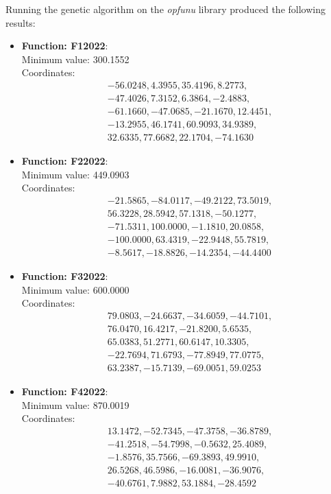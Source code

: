 \documentclass{article}
\begin{document}
Running the genetic algorithm on the \textit{opfunu} library
produced the following results:

\begin{itemize}
  \item \textbf{Function: F12022}: \\
    Minimum value: 300.1552 \\
    Coordinates:
    \[
      \begin{aligned}
        & -56.0248, 4.3955, 35.4196, 8.2773, \\
        & -47.4026, 7.3152, 6.3864, -2.4883, \\
        & -61.1660, -47.0685, -21.1670, 12.4451, \\
        & -13.2955, 46.1741, 60.9093, 34.9389, \\
        & 32.6335, 77.6682, 22.1704, -74.1630
      \end{aligned}
    \]

  \item \textbf{Function: F22022}: \\
    Minimum value: 449.0903 \\
    Coordinates:
    \[
      \begin{aligned}
        & -21.5865, -84.0117, -49.2122, 73.5019, \\
        & 56.3228, 28.5942, 57.1318, -50.1277, \\
        & -71.5311, 100.0000, -1.1810, 20.0858, \\
        & -100.0000, 63.4319, -22.9448, 55.7819, \\
        & -8.5617, -18.8826, -14.2354, -44.4400
      \end{aligned}
    \]

  \item \textbf{Function: F32022}: \\
    Minimum value: 600.0000 \\
    Coordinates:
    \[
      \begin{aligned}
        & 79.0803, -24.6637, -34.6059, -44.7101, \\
        & 76.0470, 16.4217, -21.8200, 5.6535, \\
        & 65.0383, 51.2771, 60.6147, 10.3305, \\
        & -22.7694, 71.6793, -77.8949, 77.0775, \\
        & 63.2387, -15.7139, -69.0051, 59.0253
      \end{aligned}
    \]

  \item \textbf{Function: F42022}: \\
    Minimum value: 870.0019 \\
    Coordinates:
    \[
      \begin{aligned}
        & 13.1472, -52.7345, -47.3758, -36.8789, \\
        & -41.2518, -54.7998, -0.5632, 25.4089, \\
        & -1.8576, 35.7566, -69.3893, 49.9910, \\
        & 26.5268, 46.5986, -16.0081, -36.9076, \\
        & -40.6761, 7.9882, 53.1884, -28.4592
      \end{aligned}
    \]


\end{itemize}
\end{document}
